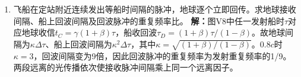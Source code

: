\documentclass[UTF8,fontset=fandol,a4paper,11pt]{ctexart}
\begin{document}
\begin{enumerate}
\item 飞船在定站附近连续发出等船时间隔的脉冲，地球逐个立即回传。求地球接收间隔、船上回波间隔及回波脉冲的重复频率比。
\textbf{解：}图V8中任一发射船时$\tau$对应地球收信$t_C=\gamma(1+\beta)\tau$，船收回波$\tau_D=(1+\beta)\tau/(1-\beta)$。故地球间隔为$\kappa\Delta\tau$、船上回波间隔为$\kappa^2\Delta\tau$，其中$\kappa=\sqrt{(1+\beta)/(1-\beta)}$。0.8$c$时$\kappa=3$，回波间隔变为9倍，因此回波脉冲的重复频率为发射重复频率的1/9。两段远离的光传播依次使接收脉冲间隔乘上同一个远离因子。
\begin{center}\begin{minipage}{.98\linewidth}\centering
{}
\end{minipage}
\end{center}
\end{enumerate}
\end{document}
